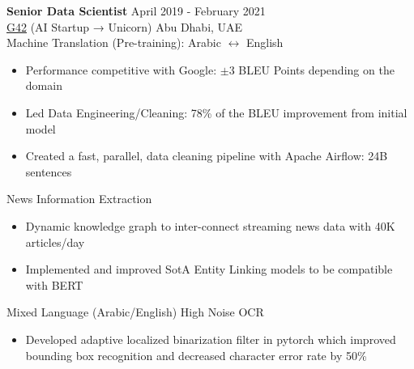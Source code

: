 \documentclass[margin, line]{res} %
\begin{document}
\begin{resume}
{\textbf{Senior Data Scientist}} \hfill April 2019 - February 2021\\
\href{https://g42.ai/}{G42} (AI Startup → Unicorn) \hfill Abu Dhabi, UAE\\
Machine Translation (Pre-training): Arabic $\leftrightarrow$ English
\begin{itemize} \itemsep -2pt %
\item Performance competitive with Google:  $\pm $3 BLEU Points depending on the domain
\item Led Data Engineering/Cleaning: 78\% of the BLEU improvement from initial model
\item Created a fast, parallel, data cleaning pipeline with Apache Airflow: 24B sentences
\end{itemize}

News Information Extraction
\begin{itemize} \itemsep -2pt %
\item Dynamic knowledge graph to inter-connect streaming news data with 40K articles/day
\item Implemented and improved SotA Entity Linking models to be compatible with BERT
\end{itemize}
Mixed Language (Arabic/English) High Noise OCR
\begin{itemize} \itemsep -2pt %
\item Developed adaptive localized binarization filter in pytorch which improved bounding box recognition and decreased character error rate by 50\%
\end{itemize}


\end{resume}
\end{document}
